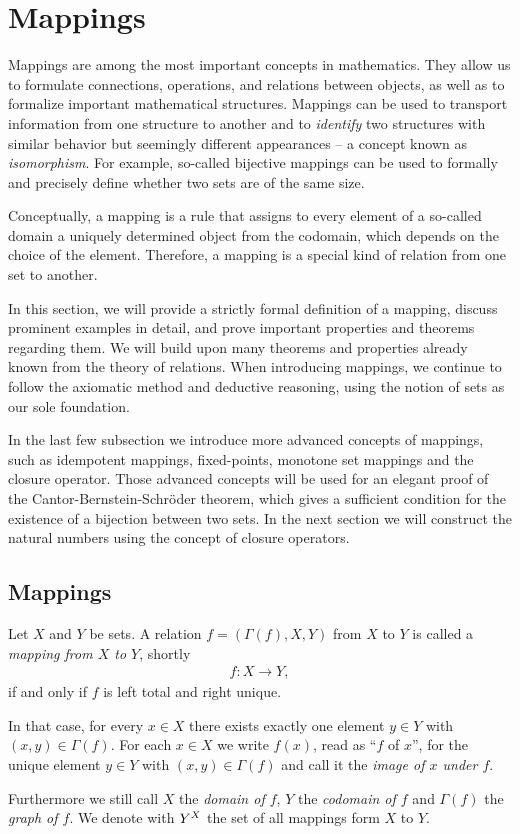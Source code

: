 \section{Mappings}

Mappings are among the most important concepts in mathematics. They allow us to formulate connections, operations, and relations between objects, as well as to formalize important mathematical structures. Mappings can be used to transport information from one structure to another and to \emph{identify} two structures with similar behavior but seemingly different appearances -- a concept known as \emph{isomorphism}. For example, so-called bijective mappings can be used to formally and precisely define whether two sets are of the same size.

Conceptually, a mapping is a rule that assigns to every element of a so-called domain a uniquely determined object from the codomain, which depends on the choice of the element. Therefore, a mapping is a special kind of relation from one set to another.

In this section, we will provide a strictly formal definition of a mapping, discuss prominent examples in detail, and prove important properties and theorems regarding them. We will build upon many theorems and properties already known from the theory of relations. When introducing mappings, we continue to follow the axiomatic method and deductive reasoning, using the notion of sets as our sole foundation.

In the last few subsection we introduce more advanced concepts of mappings, such as idempotent mappings, fixed-points, monotone set mappings and the closure operator. Those advanced concepts will be used for an elegant proof of the Cantor-Bernstein-Schröder theorem, which gives a sufficient condition for the existence of a bijection between two sets. In the next section we will construct the natural numbers using the concept of closure operators.

\subsection{Mappings}

\begin{definition}[Mappings]
    Let $X$ and $Y$ be sets. A relation $f=(\Gamma(f),X,Y)$ from $X$ to $Y$ is called a \emph{mapping from $X$ to $Y$}, shortly \begin{align}f\colon X\rightarrow Y,\end{align} if and only if $f$ is left total and right unique.
    
    In that case, for every $x\in X$ there exists exactly one element $y\in Y$ with $(x,y)\in\Gamma(f)$. For each $x\in X$ we write $f(x)$, read as \enquote{$f$ of $x$}, for the unique element $y\in Y$ with $(x,y)\in\Gamma(f)$ and call it the \emph{image of $x$ under $f$}.
    
    Furthermore we still call $X$ the \emph{domain of $f$}, $Y$ the \emph{codomain of $f$} and $\Gamma(f)$ the \emph{graph of $f$}. We denote with $\mapset X Y$ the set of all mappings form $X$ to $Y$.
\end{definition}

